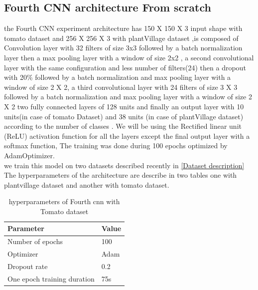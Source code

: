 \subsection{Fourth CNN architecture From scratch}
the Fourth CNN experiment architecture has 150 X 150 X 3 input shape with tomato dataset and 256 X 256 X 3 with plantVillage dataset ,is composed of Convolution layer with 32 filters of size 3x3 followed by a batch normalization layer then
a max pooling layer with a window of size 2x2 , a second convolutional layer with the same configuration and less number of filters(24) then a dropout with 20\% followed by a batch normalization and max pooling layer with a window of size 2 X 2,
a third convolutional layer with 24 filters of size 3 X 3
followed by a batch normalization and max pooling layer with a window of size 2 X 2
two fully connected layers of 128 units and finally an output layer with 10 units(in case of tomato Dataset) and 38 units (in case of plantVillage dataset) according to the number of classes .
We will be using the Rectified linear unit (ReLU) activation
function for all the layers except the final output layer with a softmax function,
The training was done
during 100 epochs optimized by AdamOptimizer.\\
we train this model on two datasets described recently in \ref{Dataset description}
The hyperparameters of the architecture are
describe in two tables one with plantvillage dataset and another with tomato dataset.\\

\begin{table}[H]
\begin{tabular}{@{}|p{9cm}|p{3cm}|@{}}
\hline
 \centering \textbf{Parameter} & \textbf{Value}  \\ \hline
 Number of epochs & 100  \\  \hline
 Optimizer & Adam \\ \hline
 Dropout rate & 0.2 \\ \hline
 One epoch training duration & 75s \\ \hline
 
\end{tabular}
\caption{hyperparameters of Fourth cnn with Tomato dataset}
\end{table}

